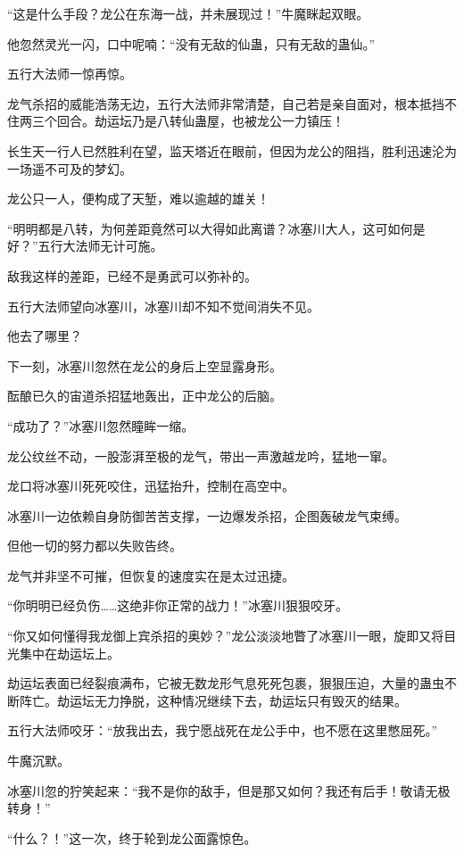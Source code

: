\begin{this_body}
“这是什么手段？龙公在东海一战，并未展现过！”牛魔眯起双眼。

他忽然灵光一闪，口中呢喃：“没有无敌的仙蛊，只有无敌的蛊仙。”

五行大法师一惊再惊。

龙气杀招的威能浩荡无边，五行大法师非常清楚，自己若是亲自面对，根本抵挡不住两三个回合。劫运坛乃是八转仙蛊屋，也被龙公一力镇压！

长生天一行人已然胜利在望，监天塔近在眼前，但因为龙公的阻挡，胜利迅速沦为一场遥不可及的梦幻。

龙公只一人，便构成了天堑，难以逾越的雄关！

“明明都是八转，为何差距竟然可以大得如此离谱？冰塞川大人，这可如何是好？”五行大法师无计可施。

敌我这样的差距，已经不是勇武可以弥补的。

五行大法师望向冰塞川，冰塞川却不知不觉间消失不见。

他去了哪里？

下一刻，冰塞川忽然在龙公的身后上空显露身形。

酝酿已久的宙道杀招猛地轰出，正中龙公的后脑。

“成功了？”冰塞川忽然瞳眸一缩。

龙公纹丝不动，一股澎湃至极的龙气，带出一声激越龙吟，猛地一窜。

龙口将冰塞川死死咬住，迅猛抬升，控制在高空中。

冰塞川一边依赖自身防御苦苦支撑，一边爆发杀招，企图轰破龙气束缚。

但他一切的努力都以失败告终。

龙气并非坚不可摧，但恢复的速度实在是太过迅捷。

“你明明已经负伤……这绝非你正常的战力！”冰塞川狠狠咬牙。

“你又如何懂得我龙御上宾杀招的奥妙？”龙公淡淡地瞥了冰塞川一眼，旋即又将目光集中在劫运坛上。

劫运坛表面已经裂痕满布，它被无数龙形气息死死包裹，狠狠压迫，大量的蛊虫不断阵亡。劫运坛无力挣脱，这种情况继续下去，劫运坛只有毁灭的结果。

五行大法师咬牙：“放我出去，我宁愿战死在龙公手中，也不愿在这里憋屈死。”

牛魔沉默。

冰塞川忽的狞笑起来：“我不是你的敌手，但是那又如何？我还有后手！敬请无极转身！”

“什么？！”这一次，终于轮到龙公面露惊色。

\end{this_body}

